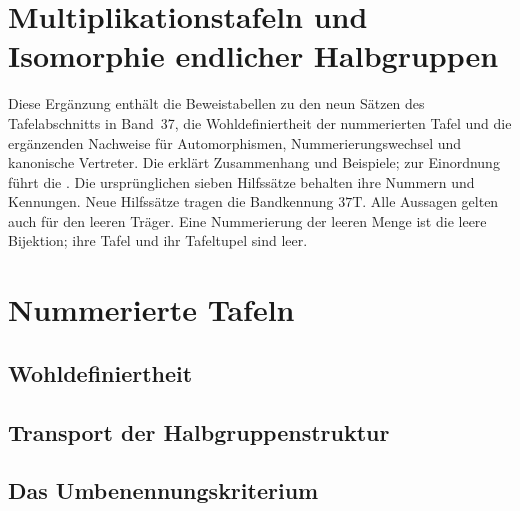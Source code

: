\section*{Multiplikationstafeln und Isomorphie endlicher Halbgruppen}
\hypertarget{table-isomorphisms.proofs}{}

Diese Ergänzung enthält die Beweistabellen zu den neun Sätzen des
Tafelabschnitts in Band~37, die Wohldefiniertheit der nummerierten Tafel
und die ergänzenden Nachweise für Automorphismen, Nummerierungswechsel
und kanonische Vertreter. Die \TableIsomorphismsReadingLink{} erklärt
Zusammenhang und Beispiele; zur Einordnung führt die \TableIsomorphismsMainLink{}.
Die ursprünglichen sieben Hilfssätze behalten ihre Nummern und Kennungen.
Neue Hilfssätze tragen die Bandkennung \(37\mathrm T\).
Alle Aussagen gelten auch für den leeren Träger. Eine Nummerierung der
leeren Menge ist die leere Bijektion; ihre Tafel und ihr Tafeltupel sind leer.

\section{Nummerierte Tafeln}
\subsection{Wohldefiniertheit}
\hypertarget{table-isomorphisms.proof.FiniteSemigroupMultiplicationTableDef}{}


\subsection{Transport der Halbgruppenstruktur}
\hypertarget{table-isomorphisms.proof.FiniteSemigroupMultiplicationTableTransport}{}
\begingroup
\renewcommand{\theformulaThm}{37.4.1.1}

\endgroup

\subsection{Das Umbenennungskriterium}
\hypertarget{table-isomorphisms.proof.FiniteSemigroupTableRelabelCriterion}{}


